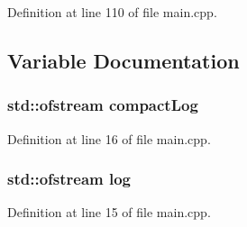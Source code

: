 Definition at line 110 of file main.\+cpp.



\subsection{Variable Documentation}
\subsubsection[{compact\+Log}]{\setlength{\rightskip}{0pt plus 5cm}std\+::ofstream compact\+Log}\label{main_8cpp_aea45ea491228e65ad5260c65e592e801}


Definition at line 16 of file main.\+cpp.

\subsubsection[{log}]{\setlength{\rightskip}{0pt plus 5cm}std\+::ofstream log}\label{main_8cpp_a32def6abcbf45dc4ffc6bf743fc9bb61}


Definition at line 15 of file main.\+cpp.

